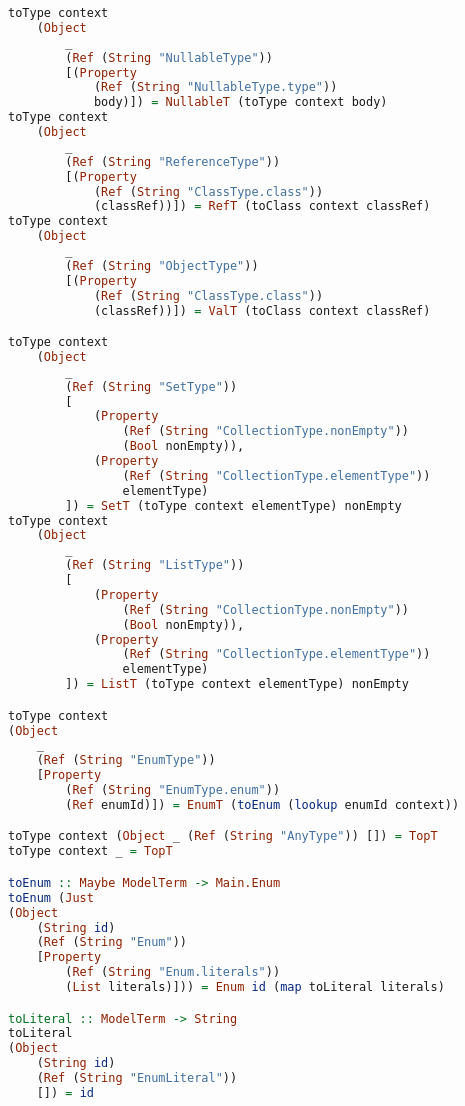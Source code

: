 \begin{lstlisting}[language=Haskell]
toType context 
	(Object 
		_ 
		(Ref (String "NullableType")) 
		[(Property 
			(Ref (String "NullableType.type")) 
			body)]) = NullableT (toType context body)
toType context 
	(Object 
		_ 
		(Ref (String "ReferenceType")) 
		[(Property 
			(Ref (String "ClassType.class")) 
			(classRef))]) = RefT (toClass context classRef)
toType context 
	(Object 
		_ 
		(Ref (String "ObjectType")) 
		[(Property 
			(Ref (String "ClassType.class")) 
			(classRef))]) = ValT (toClass context classRef)

toType context 
	(Object 
		_ 
		(Ref (String "SetType")) 
		[
			(Property 
				(Ref (String "CollectionType.nonEmpty")) 
				(Bool nonEmpty)),
			(Property 
				(Ref (String "CollectionType.elementType")) 
				elementType)
		]) = SetT (toType context elementType) nonEmpty
toType context 
	(Object 
		_ 
		(Ref (String "ListType")) 
		[
			(Property 
				(Ref (String "CollectionType.nonEmpty")) 
				(Bool nonEmpty)),
			(Property 
				(Ref (String "CollectionType.elementType")) 
				elementType)
		]) = ListT (toType context elementType) nonEmpty

toType context 
(Object 
    _ 
    (Ref (String "EnumType")) 
    [Property 
        (Ref (String "EnumType.enum"))
        (Ref enumId)]) = EnumT (toEnum (lookup enumId context))

toType context (Object _ (Ref (String "AnyType")) []) = TopT
toType context _ = TopT

toEnum :: Maybe ModelTerm -> Main.Enum
toEnum (Just 
(Object 
    (String id)
    (Ref (String "Enum"))
    [Property 
        (Ref (String "Enum.literals"))
        (List literals)])) = Enum id (map toLiteral literals)

toLiteral :: ModelTerm -> String
toLiteral 
(Object 
    (String id) 
    (Ref (String "EnumLiteral")) 
    []) = id
\end{lstlisting}

